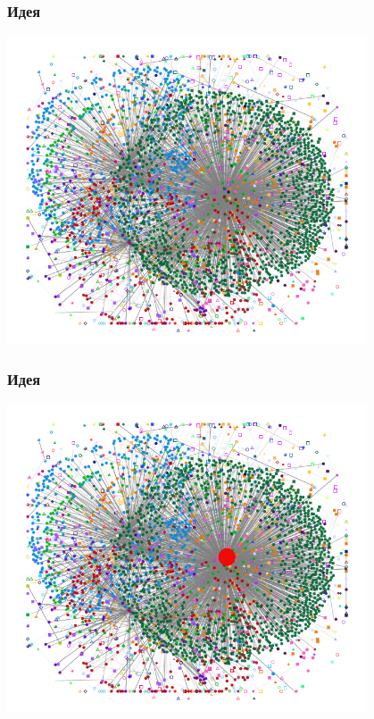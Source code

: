 \documentclass[10pt, compress]{beamer}
\begin{document}
\begin{frame}[fragile]
  \frametitle{Идея}
    {\vspace{-2em}\begin{center}\includegraphics[width=0.8\textwidth,height=0.8\textheight]{images/floyd_social_1.png}\end{center}}

\end{frame}

\begin{frame}[fragile]
  \frametitle{Идея}
    {\vspace{-2em}\begin{center}\includegraphics[width=0.8\textwidth,height=0.8\textheight]{images/floyd_social_2.png}\end{center}}

\end{frame}
\end{document}
